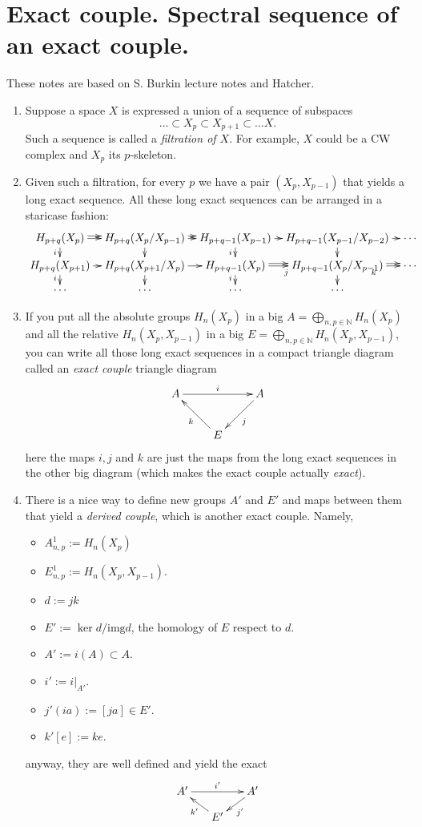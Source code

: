 \section{Exact couple. Spectral sequence of
an exact couple.}
\label{section-exact-coupl-spect-seque}

These notes are based on S. Burkin lecture
notes and Hatcher.

\begin{enumerate}
	\item Suppose a space $X$ is expressed a
	union of a sequence of subspaces
		$$\ldots\subset X_p\subset X_{p+1}\subset
		\ldots X.$$
		Such a sequence is called a {\it filtration
		of $X$}. For example, $X$ could be a CW
		complex and $X_p$ its $p$-skeleton.

	\item Given such a filtration, for every $p$
	we have a pair $(X_p,X_{p-1})$ that yields a
	long exact sequence. All these long exact
	sequences can be arranged in a staricase
	fashion:
$$
\xymatrix@C=.7em@R=.8em{
	H_{p+q}(X_p)\ar@<.5ex>[r]\ar[r]\ar[d]_{i}
	&H_{p+q}(X_p/X_{p-1})\ar@<.5ex>[r]\ar[r]
	\ar[d]
	&H_{p+q-1}(X_{p-1})\ar[r]\ar[d]_{i}
	&H_{p+q-1}(X_{p-1}/X_{p-2})\ar[d]\ar[r]
	&\cdots\\
	H_{p+q}(X_{p+1})\ar[r]\ar[d]_{i}
	&H_{p+q}(X_{p+1}/X_{p})\ar[r]\ar[d]
	&H_{p+q-1}(X_{p})\ar@<.5ex>[r]\ar[r]_{j}
	\ar[d]_{i}
	&H_{p+q-1}(X_{p}/X_{p-1})\ar@<.5ex>[r]\ar[d]
	\ar[r]_{k}
	&\cdots\\
	\cdots&\cdots&\cdots&\cdots
}
$$
	\item If you put all the absolute groups
	$H_n(X_p)$ in a big $A=\bigoplus_{n,p\in
	\mathbb{N}}H_n(X_p)$ and all the relative
	$H_n(X_p,X_{p-1})$ in a big
	$E=\bigoplus_{n,p\in
	\mathbb{N}}H_n(X_p,X_{p-1})$, you can write
	all those long exact sequences in a compact
	triangle diagram called an {\it exact
	couple} triangle diagram
	$$
	\xymatrix{
		A\ar[rr]^{i}&&A\ar[dl]^{j}\\
		&E\ar[ul]^{k}
	}
$$
here the maps $i,j$ and $k$ are just the maps
from the long exact sequences in the other
big diagram (which makes the exact couple
actually \textit{exact}).

	\item There is a nice way to define new
	groups $A'$ and $E'$ and maps between them
	that yield a {\it derived couple}, which is
	another exact couple.	Namely,
		\begin{itemize}
			\item $A^1_{n,p}:=H_n(X_p)$
			\item $E^1_{n,p}:=H_n(X_p,X_{p-1})$.
			\item $d:=jk$
			\item $E':=\ker d/\text{img}d$, the
			homology of $E$ respect to $d$.
			\item $A':=i(A)\subset A$.
			\item $i':=i|_{A'}$.
			\item $j'(ia):=[ja]\in E'$.
			\item $k'[e]:=ke$.
		\end{itemize}
	anyway, they are well defined and yield the
	exact
	$$
	\xymatrix@C=1.5em@R=1em{
		A'\ar[rr]^{i'}&&A'\ar[dl]^{j'}\\
		&E'\ar[ul]^{k'}
	}
	$$


\end{enumerate}
